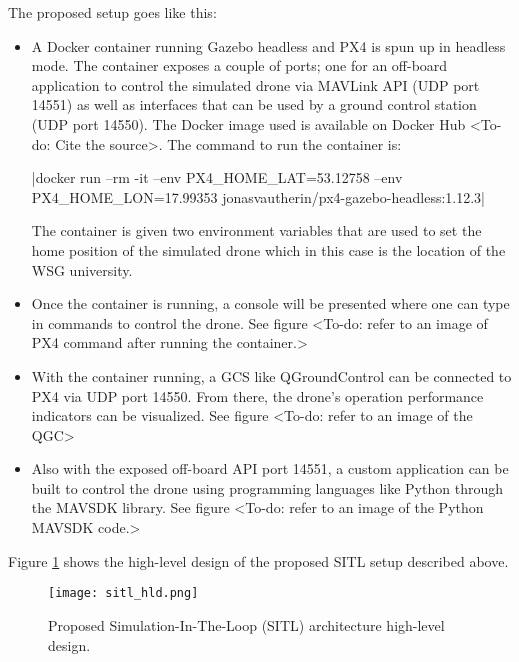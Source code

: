 The proposed setup goes like this:

\begin{itemize}
    \item A Docker container running Gazebo headless and PX4 is spun up in headless mode. The container exposes a couple of ports; one for an off-board application to control the simulated drone via MAVLink API (UDP port 14551) as well as interfaces that can be used by a ground control station (UDP port 14550). The Docker image used is available on Docker Hub <To-do: Cite the source>. The command to run the container is:

          |docker run --rm -it --env PX4_HOME_LAT=53.12758 --env PX4_HOME_LON=17.99353 jonasvautherin/px4-gazebo-headless:1.12.3|

          The container is given two environment variables that are used to set the home position of the simulated drone which in this case is the location of the WSG university.
    \item Once the container is running, a console will be presented where one can type in commands to control the drone. See figure <To-do: refer to an image of PX4 command after running the container.>
    \item With the container running, a GCS like QGroundControl can be connected to PX4 via UDP port 14550. From there, the drone's operation performance indicators can be visualized. See figure <To-do: refer to an image of the QGC>
    \item Also with the exposed off-board API port 14551, a custom application can be built to control the drone using programming languages like Python through the MAVSDK library. See figure <To-do: refer to an image of the Python MAVSDK code.>
\end{itemize}

Figure \ref{fig:sitl-hld} shows the high-level design of the proposed SITL setup described above.

\begin{figure}[H]
    \centering \texttt{[image: sitl\_hld.png]}
    \caption{Proposed Simulation-In-The-Loop (SITL) architecture high-level design.}
    \label{fig:sitl-hld}
\end{figure}



